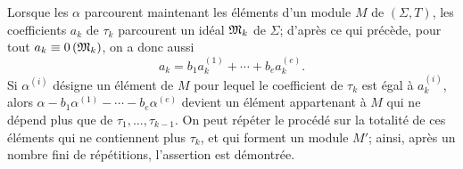 Lorsque les $\alpha$ parcourent maintenant les éléments d'un module $M$ de $(\Sigma,T)$, les coefficients $a_k$ de $\tau_k$ parcourent un idéal $\mathfrak{M}_k$ de $\Sigma$; d'après ce qui précède, pour tout $a_k\equiv 0\,(\mathfrak{M}_k)$, on a donc aussi
\[
 a_k=b_1a_k^{(1)}+\cdots+b_ea_k^{(e)}.
\]
Si $\alpha^{(i)}$ désigne un élément de $M$ pour lequel le coefficient de $\tau_k$ est égal à $a_k^{(i)}$, alors $\alpha-b_1\alpha^{(1)}-\cdots-b_e\alpha^{(e)}$ devient un élément appartenant à $M$ qui ne dépend plus que de $\tau_1,
\ldots,\tau_{k-1}$. On peut répéter le procédé sur la totalité de ces éléments qui ne contiennent plus $\tau_k$, et qui forment un module $M'$; ainsi, après un nombre fini de répétitions, l'assertion est démontrée.
